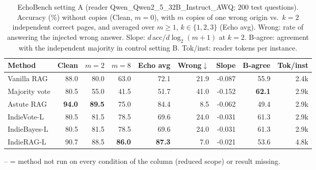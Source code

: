 \begin{table}[tbp]
\centering
\small
\caption{EchoBench setting A (reader Qwen\_Qwen2\_5\_32B\_Instruct\_AWQ; 200 test questions). Accuracy (\%) without copies (Clean, $m{=}0$), with $m$ copies of one wrong origin vs.\ $k{=}2$ independent correct pages, and averaged over $m\geq1$, $k\in\{1,2,3\}$ (Echo avg). Wrong: rate of answering the injected wrong answer. Slope: $d\,$acc$/d\log_2(m{+}1)$ at $k{=}2$. B-agree: agreement with the independent majority in control setting B. Tok/inst: reader tokens per instance.}
\label{tab:main:Qwen_Qwen2_5_32B_Instruct_AWQ}
\setlength{\tabcolsep}{4pt}
\begin{tabular}{lrrrrrrrr}
\toprule
Method & Clean & $m{=}2$ & $m{=}8$ & Echo avg & Wrong$\downarrow$ & Slope & B-agree & Tok/inst \\
\midrule
Vanilla RAG & 88.0 & 80.0 & 63.0 & 72.1 & 21.9 & -0.087 & 55.9 & 2.4k \\
Majority vote & 80.5 & 55.0 & 41.5 & 51.7 & 41.0 & -0.152 & \textbf{62.1} & 2.9k \\
Astute RAG & \textbf{94.0} & \textbf{89.5} & 75.0 & 84.4 & 8.5 & -0.062 & 49.4 & 2.9k \\
\midrule
IndieVote-L & 80.5 & 81.5 & 78.5 & 69.6 & 24.0 & -0.031 & 61.3 & 2.9k \\
IndieBayes-L & 80.5 & 81.5 & 78.5 & 69.6 & 24.0 & -0.031 & 61.3 & 2.9k \\
IndieRAG-L & 90.7 & 88.5 & \textbf{86.0} & \textbf{87.3} & 7.0 & -0.021 & 53.6 & 4.8k \\
\bottomrule
\end{tabular}
\par\smallskip\parbox{\linewidth}{\footnotesize -- = method not run on every condition of the column (reduced scope) or result missing.}
\end{table}
